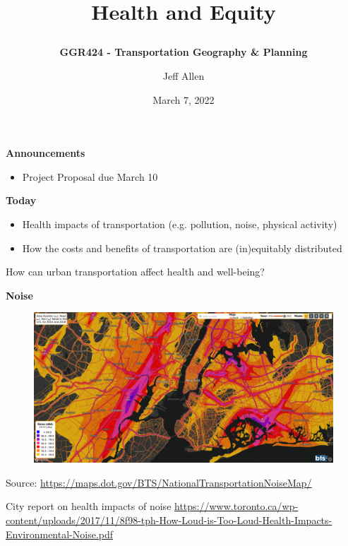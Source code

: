 \documentclass[aspectratio=169]{beamer}
\title{\textbf{Health and Equity}
\subtitle{\textbf{GGR424 - Transportation Geography \& Planning}}
\author{Jeff Allen}
\institute{University of Toronto}
\date{March 7, 2022}}
\begin{document}
	
\begin{frame}
	\titlepage	
\end{frame}





\begin{frame}
	
	\textbf{Announcements}
	
	\begin{itemize}
		\item Project Proposal due March 10
	\end{itemize}
	
	
	\textbf{Today}
	
	\begin{itemize}
		\item Health impacts of	transportation (e.g. pollution, noise, physical activity)
		\item How the costs and benefits of transportation are (in)equitably distributed
		
	\end{itemize}
\end{frame}




\begin{frame}
	
	How can urban transportation affect health and well-being?
	
\end{frame}



\begin{frame}
	
	\textbf{Noise}
	
	\begin{figure}
		\centering
		\includegraphics[width=1\linewidth]{images/noise_nyc.png}
	\end{figure}
	\tiny Source: \url{https://maps.dot.gov/BTS/NationalTransportationNoiseMap/}
	
	\vspace{2mm}
	\tiny City report on health impacts of noise \url{https://www.toronto.ca/wp-content/uploads/2017/11/8f98-tph-How-Loud-is-Too-Loud-Health-Impacts-Environmental-Noise.pdf}
	
\end{frame}
\end{document}
